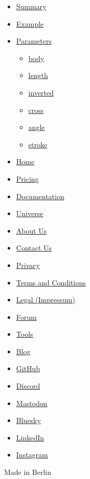 \begin{itemize}
\tightlist
\item
  \hyperref[summary]{Summary}
\item
  \hyperref[example]{Example}
\item
  \hyperref[parameters]{Parameters}

  \begin{itemize}
  \tightlist
  \item
    \hyperref[parameters-body]{body}
  \item
    \hyperref[parameters-length]{length}
  \item
    \hyperref[parameters-inverted]{inverted}
  \item
    \hyperref[parameters-cross]{cross}
  \item
    \hyperref[parameters-angle]{angle}
  \item
    \hyperref[parameters-stroke]{stroke}
  \end{itemize}
\end{itemize}

\begin{itemize}
\tightlist
\item
  \href{/}{Home}
\item
  \href{/pricing/}{Pricing}
\item
  \href{/docs/}{Documentation}
\item
  \href{/universe/}{Universe}
\item
  \href{/about/}{About Us}
\item
  \href{/contact/}{Contact Us}
\item
  \href{/privacy/}{Privacy}
\item
  \href{https://typst.app/terms}{Terms and Conditions}
\item
  \href{/legal/}{Legal (Impressum)}
\end{itemize}

\begin{itemize}
\tightlist
\item
  \href{https://forum.typst.app}{Forum}
\item
  \href{/tools/}{Tools}
\item
  \href{/blog/}{Blog}
\item
  \href{https://github.com/typst/}{GitHub}
\item
  \href{https://discord.gg/2uDybryKPe}{Discord}
\item
  \href{https://mastodon.social/@typst}{Mastodon}
\item
  \href{https://bsky.app/profile/typst.app}{Bluesky}
\item
  \href{https://www.linkedin.com/company/typst/}{LinkedIn}
\item
  \href{https://instagram.com/typstapp/}{Instagram}
\end{itemize}

Made in Berlin
